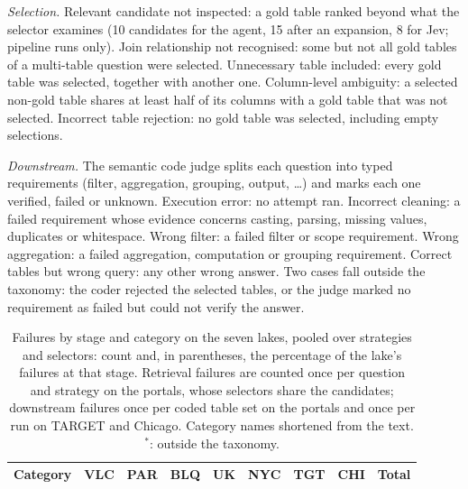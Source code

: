 \emph{Selection.} Relevant candidate not inspected: a gold table ranked beyond
what the selector examines (10 candidates for the agent, 15 after an
expansion, 8 for Jev; pipeline runs only). Join relationship not recognised:
some but not all gold tables of a multi-table question were selected.
Unnecessary table included: every gold table was selected, together with
another one. Column-level ambiguity: a selected non-gold table shares at least
half of its columns with a gold table that was not selected. Incorrect table
rejection: no gold table was selected, including empty selections.

\emph{Downstream.} The semantic code judge splits each question into typed
requirements (filter, aggregation, grouping, output, \dots) and marks each one
verified, failed or unknown. Execution error: no attempt ran. Incorrect
cleaning: a failed requirement whose evidence concerns casting, parsing,
missing values, duplicates or whitespace. Wrong filter: a failed filter or
scope requirement. Wrong aggregation: a failed aggregation, computation or
grouping requirement. Correct tables but wrong query: any other wrong answer.
Two cases fall outside the taxonomy: the coder rejected the selected tables,
or the judge marked no requirement as failed but could not verify the answer.

\begin{table}[t]
\caption{Failures by stage and category on the seven lakes, pooled over
strategies and selectors: count and, in parentheses, the percentage of the
lake's failures at that stage. Retrieval failures are counted once per
question and strategy on the portals, whose selectors share the candidates;
downstream failures once per coded table set on the portals and once per run
on TARGET and Chicago. Category names shortened from the text. $^{*}$: outside
the taxonomy.}
\label{tab:failures}
\centering
\scriptsize
\setlength{\tabcolsep}{2pt}
\begin{tabular}{lrrrrrrrr}
\hline
Category & VLC & PAR & BLQ & UK & NYC & TGT & CHI & Total \\
\hline
\end{tabular}
\end{table}

